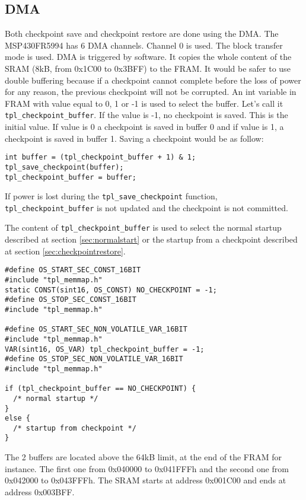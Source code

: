 \documentclass[11pt, oneside]{article}   	%
\begin{document}
\subsection{DMA}

Both checkpoint save and checkpoint restore are done using the DMA. The MSP430FR5994 has 6 DMA channels. Channel 0 is used. The block transfer mode is used. DMA is triggered by software. It copies the whole content of the SRAM (8kB, from 0x1C00 to 0x3BFF) to the FRAM. It would be safer to use double buffering because if a checkpoint cannot complete before the loss of power for any reason, the previous checkpoint will not be corrupted. An int variable in FRAM with value equal to 0, 1 or -1 is used to select the buffer. Let's call it \lstinline{tpl_checkpoint_buffer}. If the value is -1, no checkpoint is saved. This is the initial value. If value is 0 a checkpoint is saved in buffer 0 and if value is 1, a checkpoint is saved in buffer 1. Saving a checkpoint would be as follow: 

\begin{lstlisting}
int buffer = (tpl_checkpoint_buffer + 1) & 1;
tpl_save_checkpoint(buffer);
tpl_checkpoint_buffer = buffer;
\end{lstlisting}

If power is lost during the \lstinline{tpl_save_checkpoint} function, \lstinline{tpl_checkpoint_buffer} is not updated and the checkpoint is not committed. 

The content of \lstinline{tpl_checkpoint_buffer} is used to select the normal startup described at section \ref{sec:normalstart} or the startup from a checkpoint described at section \ref{sec:checkpointrestore}.

\begin{lstlisting}
#define OS_START_SEC_CONST_16BIT
#include "tpl_memmap.h"
static CONST(sint16, OS_CONST) NO_CHECKPOINT = -1;
#define OS_STOP_SEC_CONST_16BIT
#include "tpl_memmap.h"

#define OS_START_SEC_NON_VOLATILE_VAR_16BIT
#include "tpl_memmap.h"
VAR(sint16, OS_VAR) tpl_checkpoint_buffer = -1;
#define OS_STOP_SEC_NON_VOLATILE_VAR_16BIT
#include "tpl_memmap.h"

if (tpl_checkpoint_buffer == NO_CHECKPOINT) {
  /* normal startup */
}
else {
  /* startup from checkpoint */
}
\end{lstlisting}

The 2 buffers are located above the 64kB limit, at the end of the FRAM for instance. The first one from 0x040000 to 0x041FFFh and the second one from 0x042000 to 0x043FFFh.
The SRAM starts at address 0x001C00 and ends at address 0x003BFF.
\end{document}
